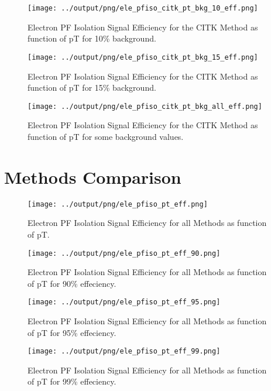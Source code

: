 \documentclass[11pt]{book}
\begin{document}
\begin{figure}[htb]
\centering
\texttt{[image: ../output/png/ele\_pfiso\_citk\_pt\_bkg\_10\_eff.png]}
\caption{Electron PF Isolation Signal Efficiency for the CITK Method as function of pT for 10\% background.}
\label{fig:ele_pfiso_pt_bkg_citk_bkg_10_eff}
\end{figure}

\begin{figure}[htb]
\centering
\texttt{[image: ../output/png/ele\_pfiso\_citk\_pt\_bkg\_15\_eff.png]}
\caption{Electron PF Isolation Signal Efficiency for the CITK Method as function of pT for 15\% background.}
\label{fig:ele_pfiso_pt_bkg_citk_bkg_15_eff}
\end{figure}

\begin{figure}[htb]
\centering
\texttt{[image: ../output/png/ele\_pfiso\_citk\_pt\_bkg\_all\_eff.png]}
\caption{Electron PF Isolation Signal Efficiency for the CITK Method as function of pT for some background values.}
\label{fig:ele_pfiso_pt_bkg_citk_bkg_all_eff}
\end{figure}
\clearpage

\section{Methods Comparison}
\begin{figure}[htb]
\centering
\texttt{[image: ../output/png/ele\_pfiso\_pt\_eff.png]}
\caption{Electron PF Isolation Signal Efficiency for all Methods as function of pT.}
\label{fig:ele_pfiso_pt_eff}
\end{figure}

\begin{figure}[htb]
\centering
\texttt{[image: ../output/png/ele\_pfiso\_pt\_eff\_90.png]}
\caption{Electron PF Isolation Signal Efficiency for all Methods as function of pT for 90\% effeciency.}
\label{fig:ele_pfiso_pt_eff_90}
\end{figure}

\begin{figure}[htb]
\centering
\texttt{[image: ../output/png/ele\_pfiso\_pt\_eff\_95.png]}
\caption{Electron PF Isolation Signal Efficiency for all Methods as function of pT for 95\% effeciency.}
\label{fig:ele_pfiso_pt_eff_95}
\end{figure}

\begin{figure}[htb]
\centering
\texttt{[image: ../output/png/ele\_pfiso\_pt\_eff\_99.png]}
\caption{Electron PF Isolation Signal Efficiency for all Methods as function of pT for 99\% effeciency.}
\label{fig:ele_pfiso_pt_eff_99}
\end{figure}
\end{document}
